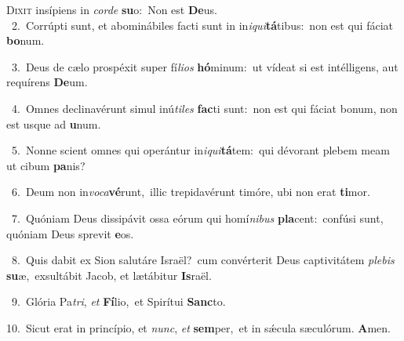 \lettrine{\initial\textcolor{\initialcolor}{D}}{ixit} insípiens in \textit{cor}\-\textit{de} \textbf{su}\-o:~\star Non est \textbf{De}\-us.\\
{\numbfont\textcolor{\numbcolor}{~2.}}~Corrúpti sunt, et abominábiles facti sunt in in\-\textit{i}\-\textit{qui}\textbf{tá}tibus:~\star non est qui fáciat \textbf{bo}\-num.\par
{\numbfont\textcolor{\numbcolor}{~3.}}~Deus de cælo prospéxit super fí\-\textit{li}\-\textit{os} \textbf{hó}\-minum:~\star ut vídeat si est intélligens, aut requírens \textbf{De}\-um.\par
{\numbfont\textcolor{\numbcolor}{~4.}}~Omnes declinavérunt simul inú\-\textit{ti}\-\textit{les} \textbf{fac}\-ti sunt:~\star non est qui fáciat bonum, non est usque ad \textbf{u}\-num.\par
{\numbfont\textcolor{\numbcolor}{~5.}}~Nonne scient omnes qui operántur in\-\textit{i}\-\textit{qui}\textbf{tá}tem:~\star qui dévorant plebem meam ut cibum \textbf{pa}\-nis?\par
{\numbfont\textcolor{\numbcolor}{~6.}}~Deum non in\-\textit{vo}\-\textit{ca}\textbf{vé}runt,~\star illic trepidavérunt timóre, ubi non erat \textbf{ti}\-mor.\par
{\numbfont\textcolor{\numbcolor}{~7.}}~Quóniam Deus dissipávit ossa eórum qui homí\-\textit{ni}\-\textit{bus} \textbf{pla}\-cent:~\star confúsi sunt, quóniam Deus sprevit \textbf{e}\-os.\par
{\numbfont\textcolor{\numbcolor}{~8.}}~Quis dabit ex Sion salutáre Israël?~\dagger cum convérterit Deus captivitátem \textit{ple}\-\textit{bis} \textbf{su}\-æ,~\star exsultábit Jacob, et lætábitur \textbf{Is}\-raël.\par
{\numbfont\textcolor{\numbcolor}{~9.}}~Glória Pa\-\textit{tri}\-, \textit{et} \textbf{Fí}\-lio,~\star et Spirítui \textbf{Sanc}\-to.\par
{\numbfont\textcolor{\numbcolor}{10.}}~Sicut erat in princípio, et \textit{nunc}\-, \textit{et} \textbf{sem}\-per,~\star et in sǽcula sæculórum. \textbf{A}\-men.\par
